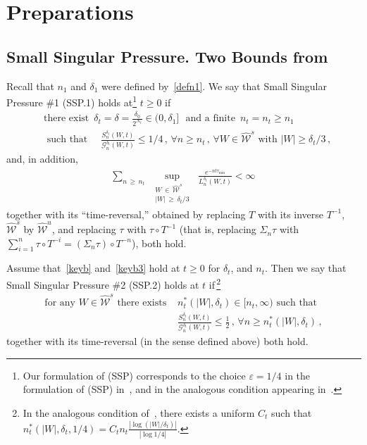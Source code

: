 \documentclass[10pt]{amsart}
\theoremstyle{definition}\newtheorem{defi}[theo]{Definition}\newtheorem{rema}[theo]{Remark}\newtheorem{exam}[theo]{Example}\newtheorem{exem}[theo]{Example}\newtheorem{nota}[theo]{Notation}
\newcommand{\cG}{\mathcal{G}}
\newcommand{\cW}{\mathcal{W}}
\newcommand{\hW}{\widehat{\cW}}
\newcommand{\ve}{\varepsilon}
\let\oldforall\forall
\renewcommand*{\forall}{\mathrel{\oldforall}}
\begin{document}
\section{Preparations}\label{boot}

\subsection{Small Singular Pressure. Two Bounds from~\cite{Ca}}\label{SSP}

Recall that $n_1$ and $\delta_1$ were defined by~\eqref{defn1}. We say that Small Singular Pressure \#1 (SSP.1) holds at\footnote{Our formulation of (SSP) corresponds to the choice $\ve=1/4$ in the formulation of (SSP) in~\cite{Ca}, and in the analogous condition appearing in~\cite[Corollary~5.3]{BD1}.} $t\ge 0$ if
\begin{equation}\label{keyb}
\begin{split}
&\text{there exist } \, \delta_t=\delta =\frac{\delta_0}{2^{N_t}}\in (0, \delta_1]\,\, \text{ and a finite } \, n_t=n_t
\ge n_1
\\
&\text{ such that }  \quad \frac{ S_n^{\delta_t}(W,t)} {\cG_n^{\delta_t}(W,t)} \le 1/4\,, \,
\forall n\ge n_t\,, \, \forall W \in \hW^s \text{ with } |W| \ge \delta_t/3\,,
\end{split}
\end{equation}
and, in addition,
\begin{align}\label{keyb3}
\sum_{n\,\ge\,n_t} \; \sup_{\substack{W\,\in\,\hW^s\\ |W|\,\ge\,\delta_t/3}}\,\,
\frac{e^{-nt \tau_{\min}} } { L^{\delta_t}_n(W,t)} < \infty \,
\end{align}
together with its ``time-reversal,'' obtained by replacing $T$ with its inverse $T^{-1}$, $\hW^s$ by $\hW^u$, and replacing $\tau$ with $\tau \circ T^{-1}$ (that is, replacing $\Sigma_n\tau$ with $\sum_{i=1}^n \tau \circ T^{-i}= (\Sigma_n \tau)\circ T^{-n}$), both hold.


Assume that~\eqref{keyb} and~\eqref{keyb3} hold at $t\ge 0$ for $\delta_t$, and $n_t$. Then we say that Small Singular Pressure \#2 (SSP.2) holds at $t$ if\,\footnote{In the analogous condition of~\cite[Corollary~5.3]{BD1}, there exists a uniform $C_t$ such that $n^*_t(|W|,\delta_t, 1/4)=C_t n_t\frac{|\log (|W|/\delta_{{t}})|}{|\log 1/4|}$.}
\begin{align}\label{keyb2}
\text{for any } W \in \hW^s \text{ there exists }& n^*_t(|W|,\delta_t) \in [n_t, \infty)
\text{ such that }\\
&\frac{ S_n^{\delta_t}(W,t)} {\cG_n^{\delta_t}(W,t)} \le \frac 1 2
\,, \, \forall n\ge n^*_t (|W|,\delta_t)\,,\nonumber
\end{align}
together with its time-reversal (in the sense defined above) both hold.
\end{document}
